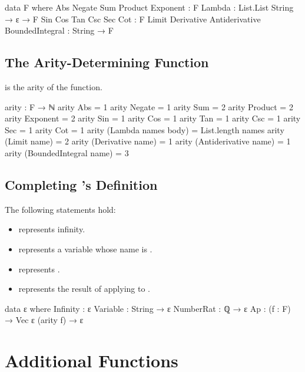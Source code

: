 \documentclass{report}
\begin{document}
\begin{code}
data F where
  Abs
   Negate
   Sum
   Product
   Exponent : F
  Lambda : List.List String → ε → F
  Sin
   Cos
   Tan
   Csc
   Sec
   Cot : F
  Limit
   Derivative
   Antiderivative
   BoundedIntegral : String → F
\end{code}

\subsection{The Arity-Determining Function}
  is the arity of the  function.

\begin{code}
arity : F → ℕ
arity Abs = 1
arity Negate = 1
arity Sum = 2
arity Product = 2
arity Exponent = 2
arity Sin = 1
arity Cos = 1
arity Tan = 1
arity Csc = 1
arity Sec = 1
arity Cot = 1
arity (Lambda names body) = List.length names
arity (Limit name) = 2
arity (Derivative name) = 1
arity (Antiderivative name) = 1
arity (BoundedIntegral name) = 3
\end{code}

\subsection{Completing 's Definition}
The following statements hold:

\begin{itemize}
  \item {} represents infinity.
  \item {}  represents a variable whose name is .
  \item {}  represents .
  \item {}   represents the result of applying  to .
\end{itemize}

\begin{code}
data ε where
  Infinity : ε
  Variable : String → ε
  NumberRat : ℚ → ε
  Ap : (f : F) → Vec ε (arity f) → ε
\end{code}

\section{Additional Functions}
\end{document}
